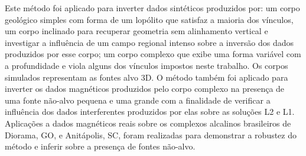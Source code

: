Este método foi aplicado para inverter dados sintéticos produzidos por: um corpo geológico simples com forma de um lopólito que satisfaz a maioria dos vínculos, um corpo inclinado para recuperar geometria sem alinhamento vertical e investigar a influência de um campo regional intenso sobre a inversão dos dados produzidos por esse corpo; um corpo complexo que exibe uma forma variável com a profundidade e viola alguns dos vínculos impostos neste trabalho.
Os corpos simulados representam as fontes alvo 3D.
O método também foi aplicado para inverter os dados magnéticos produzidos pelo corpo complexo na presença de uma fonte não-alvo pequena e uma grande com a finalidade de verificar a influência dos dados interferentes produzidos por elas sobre as soluções L2 e L1.
Aplicações a dados magnéticos reais sobre os complexos alcalinos brasileiros de Diorama, GO, e Anitápolis, SC, foram realizadas para demonstrar a robustez do método e inferir sobre a presença de fontes não-alvo.